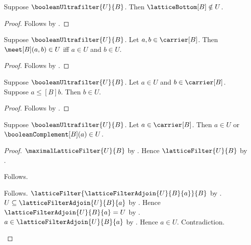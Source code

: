 \begin{proposition}\label{boolean_ultrafilter_bottom_notin}
    Suppose $\booleanUltrafilter{U}{B}$.
    Then $\latticeBottom[B]\notin U$.
\end{proposition}
\begin{proof}
    Follows by
        .
\end{proof}

\begin{proposition}\label{boolean_ultrafilter_meet_in_iff}
    Suppose $\booleanUltrafilter{U}{B}$.
    Let $a,b\in\carrier[B]$.
    Then $\meet[B](a,b)\in U$ iff $a\in U$ and $b\in U$.
\end{proposition}
\begin{proof}
    Follows by
        .
\end{proof}

\begin{proposition}\label{boolean_ultrafilter_upward}
    Suppose $\booleanUltrafilter{U}{B}$.
    Let $a\in U$ and $b\in\carrier[B]$.
    Suppose $a\mathrel{\leq[B]}b$.
    Then $b\in U$.
\end{proposition}
\begin{proof}
    Follows by
        .
\end{proof}

\begin{theorem}\label{boolean_ultrafilter_decides}
    Suppose $\booleanUltrafilter{U}{B}$.
    Let $a\in\carrier[B]$.
    Then $a\in U$ or $\booleanComplement[B](a)\in U$.
\end{theorem}
\begin{proof}
    $\maximalLatticeFilter{U}{B}$ by
        .
    Hence $\latticeFilter{U}{B}$ by
        .
    \begin{byCase}
        Follows.
        \begin{byCase}
            Follows.
            $\latticeFilter{\latticeFilterAdjoin{U}{B}{a}}{B}$ by
                .
            $U\subseteq\latticeFilterAdjoin{U}{B}{a}$ by
                .
            Hence $\latticeFilterAdjoin{U}{B}{a}=U$ by
                .
            $a\in\latticeFilterAdjoin{U}{B}{a}$ by
                .
            Hence $a\in U$.
            Contradiction.
        \end{byCase}
    \end{byCase}
\end{proof}

